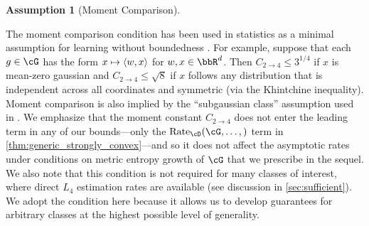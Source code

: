 \documentclass[11pt]{article} %
\newcommand{\journal}[1]{\iftoggle{journal}{#1}{}}
\newcommand{\preprint}[1]{\iftoggle{journal}{}{#1}}
\newcommand{\pref}[1]{\cref{#1}}
\theoremstyle{theorem}  %
\newtheorem{assumption}{Assumption}
\theoremstyle{plain}
\DeclarePairedDelimiter{\crl}{\{}{\}}
\DeclarePairedDelimiter{\prn}{(}{)}
\DeclarePairedDelimiter{\nrm}{\|}{\|}
\DeclarePairedDelimiter{\tri}{\langle}{\rangle}
\DeclareMathOperator{\En}{\mathbb{E}}
\newcommand{\ls}{\ell}
\newcommand{\nuisance}{\cG}
\newcommand{\Rate}{\mathrm{Rate}_{\cD}}
\newcommand{\gtone}{g_0}
\newcommand{\momentconstant}{C_{2\to{}4}}
\begin{document}
%

%
%
%
%
%
%

%

%

%
%
%


%
%
%
%
%

\begin{assumption}[Moment Comparison]
\label{ass:moment}
\journal{$\nrm*{g-\gtone}_{L_{4}(\ls_2,\cD)}\leq{}\momentconstant\cdot \nrm*{g-\gtone}_{L_{2}(\ls_2,\cD)},$ for all $g\in\nuisance$ for a constant $\momentconstant$.
}
\preprint{
  There is a constant $\momentconstant$ such that\[
\frac{\nrm*{g-\gtone}_{L_{4}(\ls_2,\cD)}}{\nrm*{g-\gtone}_{L_{2}(\ls_2,\cD)}}\leq{}\momentconstant,\quad{}\forall{}g\in\nuisance.
\]}
\end{assumption}
The moment comparison condition has been used in statistics as a minimal assumption for learning without boundedness \citep{lecue2013learning,mendelson2014learning,liang2015learning}. For example, suppose that each $g\in\nuisance$ has the form $x\mapsto{}\tri*{w,x}$ for $w,x\in\bbR^{d}$. Then $\momentconstant\leq{}3^{1/4}$ if $x$ is mean-zero gaussian and $\momentconstant\leq{}\sqrt{8}$ if $x$ follows any distribution that is independent across all coordinates and symmetric (via the Khintchine inequality). Moment comparison is also implied by the ``subgaussian class'' assumption used in \cite{mendelson2011discrepancy,lecue2013learning}.\preprint{\footnote{Suppose $\cG$ is scalar-valued and let $\nrm*{g}_{\psi_{2}}=\inf\crl*{c>0\mid{}\En\exp\prn*{g^{2}(w)/c^{2}}\leq{}2}$. Then the subgaussian class assumption for our setting asserts that $\nrm*{g-\gtone}_{\psi_{2}}\leq{}C\nrm*{g-\gtone}_{L_2(\cD)}$ for all $g\in\nuisance$.}} We emphasize that the moment constant $\momentconstant$ does not enter the leading term in any of our bounds---only the $\Rate(\nuisance,\ldots,)$ term in \pref{thm:generic_strongly_convex}---and so it does not affect the asymptotic rates under conditions on metric entropy growth of $\nuisance$ that we prescribe in the sequel. We also note that  this condition is not required for many classes of interest, where direct $L_{4}$ estimation rates are available (see discussion in \pref{sec:sufficient}). We adopt the condition here because it allows us to develop guarantees for arbitrary classes at the highest possible level of generality.

\end{document}

